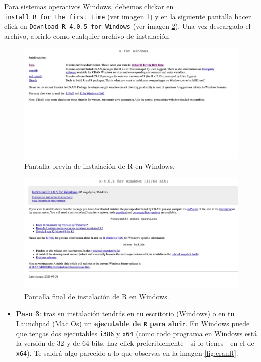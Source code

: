 \documentclass[11pt,]{book}
\providecommand{\tightlist}{%
  \setlength{\itemsep}{0pt}\setlength{\parskip}{0pt}}
\begin{document}
Para sistemas operativos Windows, debemos clickar en \texttt{install\ R\ for\ the\ first\ time} (ver imagen \ref{fig:pantalla-windows-1}) y en la siguiente pantalla hacer click en \texttt{Download\ R\ 4.0.5\ for\ Windows} (ver imagen \ref{fig:pantalla-windows-2}). Una vez descargado el archivo, abrirlo como cualquier archivo de instalación

\begin{figure}

{\centering \includegraphics[width=0.75\linewidth]{./img/pantalla_windows_1} 

}

\caption{Pantalla previa de instalación de R en Windows.}\label{fig:pantalla-windows-1}
\end{figure}

\begin{figure}

{\centering \includegraphics[width=0.75\linewidth]{./img/pantalla_windows_2} 

}

\caption{Pantalla final de instalación de R en Windows.}\label{fig:pantalla-windows-2}
\end{figure}

\begin{itemize}
\tightlist
\item
  \textbf{Paso 3}: tras su instalación tendrás en tu escritorio (Windows) o en tu Launchpad (Mac Os) un \textbf{ejecutable de \texttt{R} para abrir}. En Windows puede que tengas dos ejecutables \texttt{i386} y \texttt{x64} (como todo programa en Windows está la versión de 32 y de 64 bits, haz click preferiblemente - si lo tienes - en el de \texttt{x64}). Te saldrá algo parecido a lo que observas en la imagen \ref{fig:cranR}.
\end{itemize}
\end{document}

